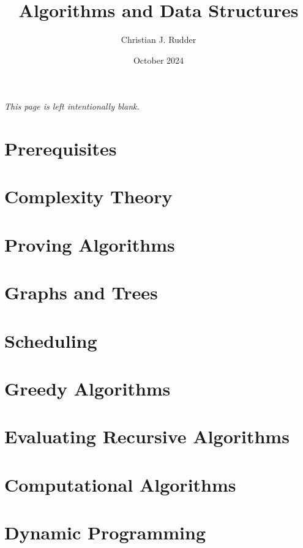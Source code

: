 \documentclass{memoir}
\title{Algorithms and Data Structures}
\author{Christian J. Rudder}
\date{October 2024}
\begin{document}
\maketitle
\setcounter{tocdepth}{2}

\tableofcontents

\newpage
\thispagestyle{empty}
\mbox{}
\vfill
\begin{center}
    \textit{This page is left intentionally blank.}
\end{center}
\vfill
\newpage



\chapter*{Prerequisites}


\chapter{Complexity Theory}

\chapter{Proving Algorithms}


\chapter{Graphs and Trees}




\chapter{Scheduling}




\chapter{Greedy Algorithms}



\chapter{Evaluating Recursive Algorithms}


\chapter{Computational Algorithms}




\chapter {Dynamic Programming}

\end{document}
